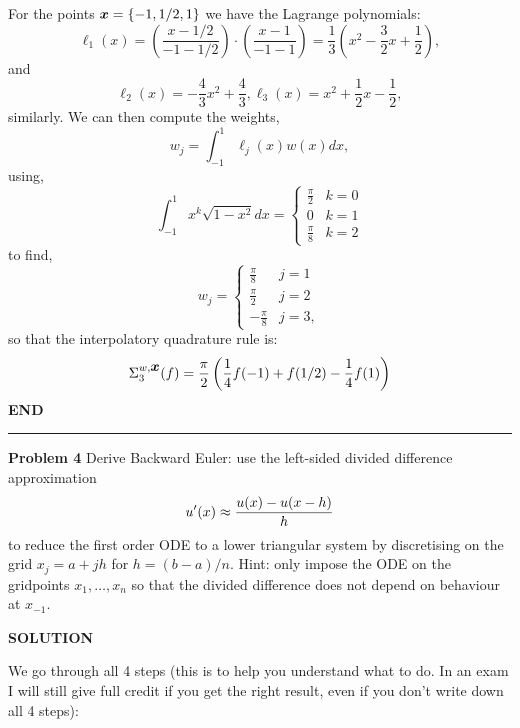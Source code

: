 \documentclass[12pt,a4paper]{article}
\def\x{ {\vc x} }
\begin{document}
For the points $\ensuremath{\bm{\x}} = \{-1, 1/2, 1\}$ we have the Lagrange polynomials:
\[
\ensuremath{\ell}_1(x) = \left(\frac{x - 1/2}{-1 - 1/2}\right)\cdot\left(\frac{x - 1}{-1 - 1}\right) = \frac{1}{3}\left(x^2 - \frac{3}{2}x + \frac{1}{2}\right),
\]
and
\[
\ensuremath{\ell}_2(x) = -\frac{4}{3}x^2 + \frac{4}{3}, \ensuremath{\ell}_3(x) =x^2 + \frac{1}{2}x - \frac{1}{2},
\]
similarly. We can then compute the weights,
\[
w_j = \int_{-1}^1 \ensuremath{\ell}_j(x)w(x)dx,
\]
using,
\[
\int_{-1}^1 x^k \sqrt{1-x^2}dx = \begin{cases}
 \frac{\ensuremath{\pi}}{2} &	k=0 \\
 0 & k=1 \\
\frac{\ensuremath{\pi}}{8} & k=2
 \end{cases}
\]
to find,
\[
w_j = \begin{cases}
 	\frac{\ensuremath{\pi}}{8} & j = 1 \\
 	\frac{\ensuremath{\pi}}{2} & j = 2 \\
 	-\frac{\ensuremath{\pi}}{8} & j = 3,
 \end{cases}
\]
so that the interpolatory quadrature rule is:
\[
\ensuremath{\Sigma}_3^{w,\ensuremath{\bm{\x}}}(f) = \frac{\ensuremath{\pi}}{2}\left(\frac{1}{4}f(-1) + f(1/2) -\frac{1}{4}f(1) \right)
\]
\textbf{END}

\rule{\textwidth}{1pt}
\textbf{Problem 4} Derive  Backward Euler: use the left-sided divided difference approximation
\[
u'(x) \ensuremath{\approx} {u(x) - u(x-h)  \over h}
\]
to reduce the first order ODE
to a lower triangular system by discretising on the grid $x_j = a + j h$ for $h = (b-a)/n$. Hint: only impose the ODE on the gridpoints $x_1,\ensuremath{\ldots},x_n$ so that the divided difference does not depend on behaviour at $x_{-1}$.

\textbf{SOLUTION}

We go through all 4 steps (this is to help you understand what to do. In an exam I will still give full credit if you get the right result, even if you don't write down all 4 steps):
\end{document}
